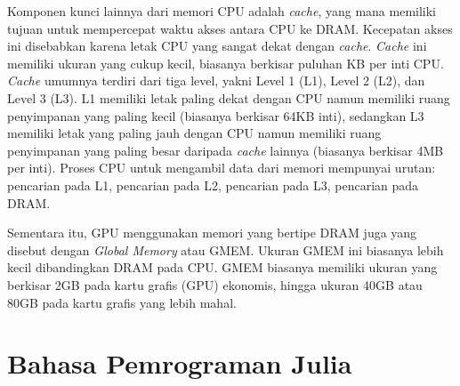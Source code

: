 Komponen kunci lainnya dari memori CPU adalah \emph{cache}, yang mana memiliki
tujuan untuk mempercepat waktu akses antara CPU ke DRAM. Kecepatan akses ini
disebabkan karena letak CPU yang sangat dekat dengan \emph{cache}. \emph{Cache}
ini memiliki ukuran yang cukup kecil, biasanya berkisar puluhan KB per inti
CPU. \emph{Cache} umumnya terdiri dari tiga level, yakni Level 1 (L1), Level 2
(L2), dan Level 3 (L3). L1 memiliki letak paling dekat dengan CPU namun
memiliki ruang penyimpanan yang paling kecil (biasanya berkisar 64KB inti),
sedangkan L3 memiliki letak yang paling jauh dengan CPU namun memiliki ruang
penyimpanan yang paling besar daripada \emph{cache} lainnya (biasanya berkisar
4MB per inti). Proses CPU untuk mengambil data dari memori mempunyai urutan:
pencarian pada L1, pencarian pada L2, pencarian pada L3, pencarian pada DRAM.

Sementara itu, GPU menggunakan memori yang bertipe DRAM juga yang disebut
dengan \emph{Global Memory} atau GMEM. Ukuran GMEM ini biasanya lebih kecil
dibandingkan DRAM pada CPU. GMEM biasanya memiliki ukuran yang berkisar 2GB
pada kartu grafis (GPU) ekonomis, hingga ukuran 40GB atau 80GB pada kartu
grafis yang lebih mahal.


\section{Bahasa Pemrograman Julia}

